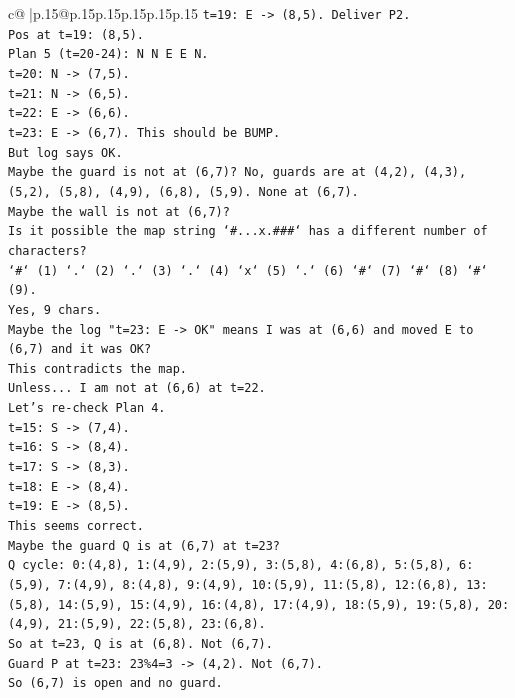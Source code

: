 \documentclass{article}
\begin{document}
{\begin{supertabular}{c@{$\;$}|p{.15\linewidth}@{}p{.15\linewidth}p{.15\linewidth}p{.15\linewidth}p{.15\linewidth}p{.15\linewidth}}
{{{\texttt{t=19: E {-}> (8,5). Deliver P2.} \\
\texttt{Pos at t=19: (8,5).} \\
\texttt{Plan 5 (t=20{-}24): N N E E N.} \\
\texttt{t=20: N {-}> (7,5).} \\
\texttt{t=21: N {-}> (6,5).} \\
\texttt{t=22: E {-}> (6,6).} \\
\texttt{t=23: E {-}> (6,7). This should be BUMP.} \\
\texttt{But log says OK.} \\
\texttt{Maybe the guard is not at (6,7)? No, guards are at (4,2), (4,3), (5,2), (5,8), (4,9), (6,8), (5,9). None at (6,7).} \\
\texttt{Maybe the wall is not at (6,7)?} \\
\texttt{Is it possible the map string `\#...x.\#\#\#` has a different number of characters?} \\
\texttt{`\#` (1) `.` (2) `.` (3) `.` (4) `x` (5) `.` (6) `\#` (7) `\#` (8) `\#` (9).} \\
\texttt{Yes, 9 chars.} \\
\texttt{Maybe the log "t=23: E {-}> OK" means I was at (6,6) and moved E to (6,7) and it was OK?} \\
\texttt{This contradicts the map.} \\
\texttt{Unless... I am not at (6,6) at t=22.} \\
\texttt{Let's re{-}check Plan 4.} \\
\texttt{t=15: S {-}> (7,4).} \\
\texttt{t=16: S {-}> (8,4).} \\
\texttt{t=17: S {-}> (8,3).} \\
\texttt{t=18: E {-}> (8,4).} \\
\texttt{t=19: E {-}> (8,5).} \\
\texttt{This seems correct.} \\
\texttt{Maybe the guard Q is at (6,7) at t=23?} \\
\texttt{Q cycle: 0:(4,8), 1:(4,9), 2:(5,9), 3:(5,8), 4:(6,8), 5:(5,8), 6:(5,9), 7:(4,9), 8:(4,8), 9:(4,9), 10:(5,9), 11:(5,8), 12:(6,8), 13:(5,8), 14:(5,9), 15:(4,9), 16:(4,8), 17:(4,9), 18:(5,9), 19:(5,8), 20:(4,9), 21:(5,9), 22:(5,8), 23:(6,8).} \\
\texttt{So at t=23, Q is at (6,8). Not (6,7).} \\
\texttt{Guard P at t=23: 23\%4=3 {-}> (4,2). Not (6,7).} \\
\texttt{So (6,7) is open and no guard.} \\
}}}
\end{supertabular}}
\end{document}
